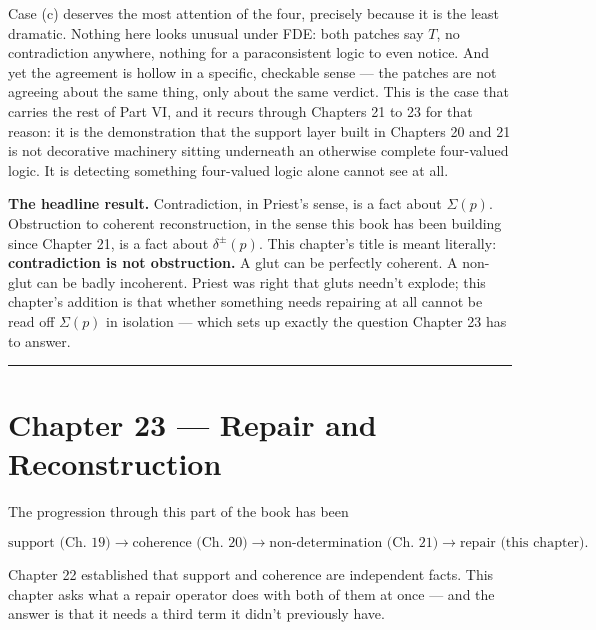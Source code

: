 Case (c) deserves the most attention of the four, precisely because it is
the least dramatic. Nothing here looks unusual under FDE: both patches
say \(T\), no contradiction anywhere, nothing for a paraconsistent logic to
even notice. And yet the agreement is hollow in a specific, checkable
sense --- the patches are not agreeing about the same thing, only about the
same verdict. This is the case that carries the rest of Part VI, and it
recurs through Chapters 21 to 23 for that reason: it is the demonstration
that the support layer built in Chapters 20 and 21 is not decorative
machinery sitting underneath an otherwise complete four-valued logic. It
is detecting something four-valued logic alone cannot see at all.

\textbf{The headline result.} Contradiction, in Priest's sense, is a fact
about \(\Sigma(p)\). Obstruction to coherent reconstruction, in the sense
this book has been building since Chapter 21, is a fact about
\(\delta^\pm(p)\). This chapter's title is meant literally:
\textbf{contradiction is not obstruction.} A glut can be perfectly coherent. A
non-glut can be badly incoherent. Priest was right that gluts needn't
explode; this chapter's addition is that whether something needs
repairing at all cannot be read off \(\Sigma(p)\) in isolation --- which sets
up exactly the question Chapter 23 has to answer.

\begin{center}\rule{0.5\linewidth}{0.5pt}\end{center}

\hypertarget{chapter-23-repair-and-reconstruction}{%
\chapter*{Chapter 23 --- Repair and Reconstruction}
\label{chapter-23-repair-and-reconstruction}}

The progression through this part of the book has been

\[\text{support (Ch. 19)} \to \text{coherence (Ch. 20)} \to \text{non-determination (Ch. 21)} \to \text{repair (this chapter)}.\]

Chapter 22 established that support and coherence are independent facts.
This chapter asks what a repair operator does with both of them at once
--- and the answer is that it needs a third term it didn't previously have.


